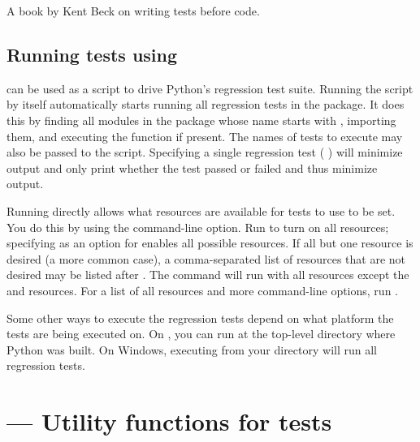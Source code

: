 \begin{seealso}
         {A book by Kent Beck on writing tests before code.}
\end{seealso}


\subsection{Running tests using  \label{regrtest}}

 can be used as a script to drive Python's
regression test suite.
Running the script by itself automatically starts running all
regression tests in the  package.
It does this by finding all modules in the package whose name starts with
, importing them, and executing the function
 if present.
The names of tests to execute may also be passed to the script.
Specifying a single regression test (
) will minimize output and only print whether
the test passed or failed and thus minimize output.

Running  directly allows what resources are
available for tests to use to be set.
You do this by using the  command-line option.
Run   to turn on all
resources; specifying  as an option for
 enables all possible resources.
If all but one resource is desired (a more common case), a
comma-separated list of resources that are not desired may be listed after
.
The command 
 will run 
with all resources except the  and
 resources.
For a list of all resources and more command-line options, run
 .

Some other ways to execute the regression tests depend on what platform the
tests are being executed on.
On \UNIX{}, you can run   at the
top-level directory where Python was built.
On Windows, executing  from your 
directory will run all regression tests.


\section{ ---
         Utility functions for tests}

